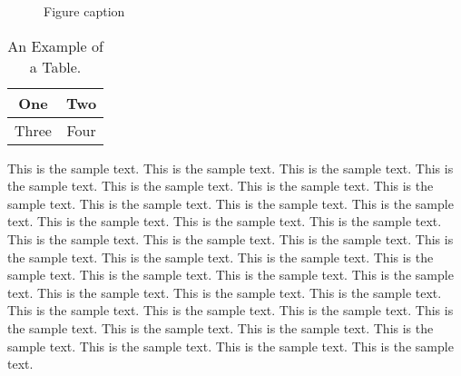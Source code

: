 \documentclass[preprint]{ptephy_v1}%
\begin{document}
\begin{figure}[!h]
\caption{Figure caption}
\end{figure}

\begin{table}[!h]
\caption{An Example of a Table.}%
\label{table_example}
\centering
\begin{tabular}{|c||c|}%
\hline
One & Two\\ %
\hline
Three & Four\\%
\hline
\end{tabular}
\end{table}%

This is the sample text. This is the sample text. This is the sample text. This is the sample text.
This is the sample text. This is the sample text. This is the sample text. This is the sample text.
This is the sample text. This is the sample text. This is the sample text. This is the sample text.
This is the sample text. This is the sample text. This is the sample text. This is the sample text.
This is the sample text. This is the sample text. This is the sample text. This is the sample text.
This is the sample text. This is the sample text. This is the sample text. This is the sample text.
This is the sample text. This is the sample text. This is the sample text. This is the sample text.
This is the sample text. This is the sample text. This is the sample text. This is the sample text.
This is the sample text. This is the sample text. This is the sample text. This is the sample text.
\end{document}
